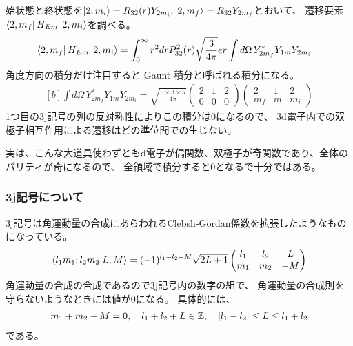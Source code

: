 \documentclass[../ap_2011.tex]{subfiles}
\begin{document}
始状態と終状態を\(\ket{2,m_i}=R_{32}(r)Y_{2m_i},\ket{2,m_f}=R_{32}Y_{2m_f}\)とおいて、
遷移要素\(\bra{2,m_f}H_{Em}\ket{2,m_i}\)を調べる。
\begin{equation}\begin{aligned}[b]
    \bra{2,m_f}H_{Em}\ket{2,m_i}
    &= \int_{0}^{\infty}r^2dr P_{32}^2(r)\sqrt{\frac{3}{4\pi}}er\int d\Omega\, Y_{2m_f}^*Y_{1m}Y_{2m_i}
\end{aligned}\end{equation}
角度方向の積分だけ注目すると Gaunt 積分と呼ばれる積分になる。
\begin{equation}\begin{aligned}[b]
    \int d\Omega\, Y_{2m_f}^*Y_{1m}Y_{2m_i}
    = \sqrt{\frac{5\times 3 \times 5}{4\pi}}\begin{pmatrix}
        2 & 1 & 2\\
        0 & 0 & 0
    \end{pmatrix}\begin{pmatrix}
        2 & 1 & 2\\
        m_f  & m & m_i
    \end{pmatrix}
\end{aligned}\end{equation}
1つ目の3j記号の列の反対称性によりこの積分は0になるので、
3d電子内での双極子相互作用による遷移はどの準位間での生じない。

実は、こんな大道具使わずともd電子が偶関数、双極子が奇関数であり、全体のパリティが奇になるので、
全領域で積分すると0となるで十分ではある。

\subsubsection*{3j記号について}
3j記号は角運動量の合成にあらわれるClebsh-Gordan係数を拡張したようなものになっている。
\begin{equation}\begin{aligned}[b]
    \bra{l_1m_1;l_2m_2}\ket{L,M}=(-1)^{l_1-l_2+M}\sqrt{2L+1}\begin{pmatrix}
        l_1 &l_2&L\\
        m_1 &m_2&-M
    \end{pmatrix}
\end{aligned}\end{equation}
角運動量の合成の合成であるので3j記号内の数字の組で、
角運動量の合成則を守らないようなときには値が0になる。
具体的には、
\begin{equation}\begin{aligned}[b]
    m_1+m_2-M=0,\quad l_1+l_2+L \in \mathbb{Z},\quad \abs{l_1-l_2}\leq L \leq l_1+l_2
\end{aligned}\end{equation}
である。
\end{document}
